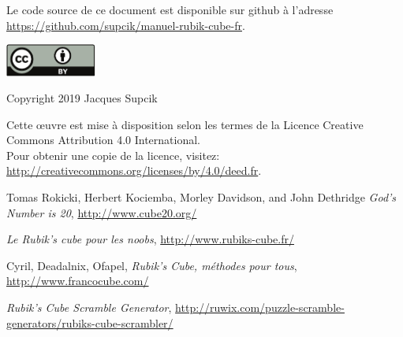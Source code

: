 \documentclass[10pt,paper=a5,pagesize]{scrbook}
\begin{document}
\frontmatter
\thispagestyle{empty}

\begin{titlepage}

\end{titlepage}

\thispagestyle{empty}
\null
\vfill

Le code source de ce document est disponible sur github à l'adresse\\
\url{https://github.com/supcik/manuel-rubik-cube-fr}.
\par\vspace*{8mm}

\begin{minipage}[c]{\textwidth}
\begin{versionhistory}
\end{versionhistory}
\end{minipage}
\par\vspace*{10mm}


\includegraphics[width=30mm]{by.pdf}

Copyright \textcopyright{} 2019 Jacques Supcik

Cette œuvre est mise à disposition selon les termes de la Licence Creative Commons Attribution 4.0 International.
\medskip\\
Pour obtenir une copie de la licence, visitez:\\
\url{http://creativecommons.org/licenses/by/4.0/deed.fr}.
\newpage

\tableofcontents

\mainmatter







\backmatter
\begin{thebibliography}{9}
	
	 Tomas Rokicki, Herbert Kociemba, Morley Davidson, and John Dethridge
	\emph{God's Number is 20},
	\url{http://www.cube20.org/}

	\emph{Le Rubik's cube pour les noobs},
	\url{http://www.rubiks-cube.fr/}

	Cyril, Deadalnix, Ofapel,
	\emph{Rubik's Cube, méthodes pour tous},
	\url{http://www.francocube.com/}
	
	\emph{Rubik’s Cube Scramble Generator},
	\url{http://ruwix.com/puzzle-scramble-generators/rubiks-cube-scrambler/}
	
	
\end{thebibliography}
\end{document}
